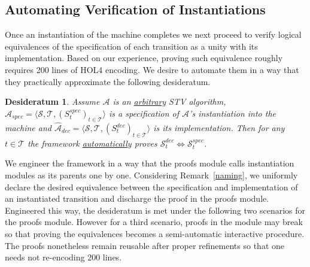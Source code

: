 \documentclass[10pt,conference]{IEEEtran}
\newtheorem{conjecture}{Desideratum}
\begin{document}
\subsection{Automating Verification of Instantiations}
Once an instantiation of the machine  completes   
 we next proceed to verify logical equivalences of the specification of each transition as a unity with its  implementation. 
Based on our experience, proving  such equivalence 
roughly requires 200 lines of HOL4 encoding. %
We desire to automate them in a way that they practically approximate the following desideratum.    
 \begin{conjecture}\label{conj}
 Assume $\mathcal{A}$ is an \underline{arbitrary} STV algorithm, $\hat{\mathcal{A}}_{spec}= \langle \mathcal{S}, \mathcal{T}, (S_{t}^{spec})_{t \in \mathcal{T}} \rangle$ is a specification of $\mathcal{A}$'s instantiation into the machine and $\hat{\mathcal{A}}_{dec}= \langle \mathcal{S}, \mathcal{T}, (S_{t}^{dec})_{t \in \mathcal{T}} \rangle$ is its implementation. 
  Then for any $t\in\mathcal{T}$ the framework \underline{automatically} proves  $\mathcal{S}_{t}^{dec}\Leftrightarrow\mathcal{S}_{t}^{spec}$. 
 \end{conjecture}
We engineer the framework in a way that the proofs module calls instantiation modules as its parents  one by one.
 Considering Remark~\ref{naming},   we uniformly declare the desired equivalence between the specification and implementation of an instantiated transition and discharge the proof in the proofs module.
Engineered this way, the desideratum is met under the following two scenarios for the proofs module. However for a third scenario, proofs in the module may break so that proving the equivalences  becomes a semi-automatic interactive procedure. The proofs nonetheless remain reusable after proper refinements so that one needs not re-encoding 200 lines. 
\end{document}
